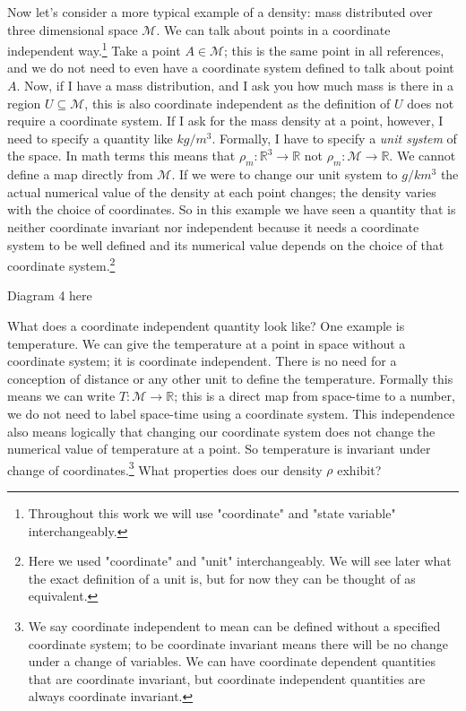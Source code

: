 \documentclass{article}
\begin{document}
	Now let's consider a more typical example of a density: mass distributed over three dimensional space $\mathcal{M}$. We can talk about points in a coordinate independent way.\footnote{Throughout this work we will use "coordinate" and "state variable" interchangeably.} Take a point $A \in \mathcal{M}$; this is the same point in all references, and we do not need to even have a coordinate system defined to talk about point $A$. Now, if I have a mass distribution, and I ask you how much mass is there in a region $U \subseteq \mathcal{M}$, this is also coordinate independent as the definition of $U$ does not require a coordinate system. If I ask for the mass density at a point, however, I need to specify a quantity like $kg/m^3$. Formally, I have to specify a \textit{unit system} of the space. In math terms this means that $\rho_m : \mathbb{R}^3 \to \mathbb{R}$ not $\rho_m : \mathcal{M} \to \mathbb{R}$. We cannot define a map directly from $\mathcal{M}$. If we were to change our unit system to $g/km^3$ the actual numerical value of the density at each point changes; the density varies with the choice of coordinates. So in this example we have seen a quantity that is neither coordinate invariant nor independent because it needs a coordinate system to be well defined and its numerical value depends on the choice of that coordinate system.\footnote{Here we used "coordinate" and "unit" interchangeably. We will see later what the exact definition of a unit is, but for now they can be thought of as equivalent.}
	
Diagram 4 here
	
	What does a coordinate independent quantity look like? One example is temperature. We can give the temperature at a point in space without a coordinate system; it is coordinate independent. There is no need for a conception of distance or any other unit to define the temperature. Formally this means we can write $T : \mathcal{M} \to \mathbb{R}$; this is a direct map from space-time to a number, we do not need to label space-time using a coordinate system. This independence also means logically that changing our coordinate system does not change the numerical value of temperature at a point. So temperature is invariant under change of coordinates.\footnote{We say coordinate independent to mean can be defined without a specified coordinate system; to be coordinate invariant means there will be no change under a change of variables. We can have coordinate dependent quantities that are coordinate invariant, but coordinate independent quantities are always coordinate invariant.} What properties does our density $\rho$ exhibit?
	
\end{document}
